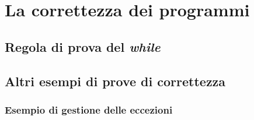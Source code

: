 \chapter{La correttezza dei programmi}
\section{Regola di prova del \textit{while}}

\section{Altri esempi di prove di correttezza}

\subsection{Esempio di gestione delle eccezioni}